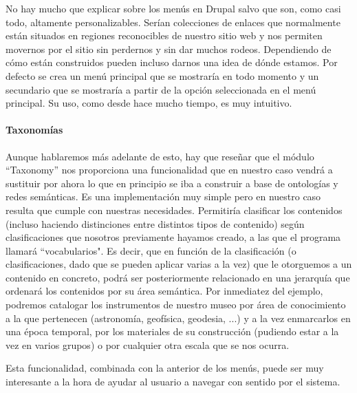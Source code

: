 \par No hay mucho que explicar sobre los menús en Drupal salvo que son, como casi todo, altamente personalizables. Serían colecciones de enlaces que normalmente están situados en regiones reconocibles de nuestro sitio web y nos permiten movernos por el sitio sin perdernos y sin dar muchos rodeos. Dependiendo de cómo están construidos pueden incluso darnos una idea de dónde estamos. Por defecto se crea un menú principal que se mostraría en todo momento y un secundario que se mostraría a partir de la opción seleccionada en el menú principal. Su uso, como desde hace mucho tiempo, es muy intuitivo.

\paragraph{Taxonomías}

\par Aunque hablaremos más adelante de esto, hay que reseñar que el módulo ``Taxonomy'' nos proporciona una funcionalidad que en nuestro caso vendrá a sustituir por ahora lo que en principio se iba a construir a base de ontologías y redes semánticas. Es una implementación muy simple pero en nuestro caso resulta que cumple con nuestras necesidades. Permitiría clasificar los contenidos (incluso haciendo distinciones entre distintos tipos de contenido) según clasificaciones que nosotros previamente hayamos creado, a las que el programa llamará ``vocabularios". Es decir, que en función de la clasificación (o clasificaciones, dado que se pueden aplicar varias a la vez) que le otorguemos a un contenido en concreto, podrá ser posteriormente relacionado en una jerarquía que ordenará los contenidos por su área semántica. Por inmediatez del ejemplo, podremos catalogar los instrumentos de nuestro museo por área de conocimiento a la que pertenecen (astronomía, geofísica, geodesia, ...) y a la vez enmarcarlos en una época temporal, por los materiales de su construcción (pudiendo estar a la vez en varios grupos) o por cualquier otra escala que se nos ocurra.
\par Esta funcionalidad, combinada con la anterior de los menús, puede ser muy interesante a la hora de ayudar al usuario a navegar con sentido por el sistema.

